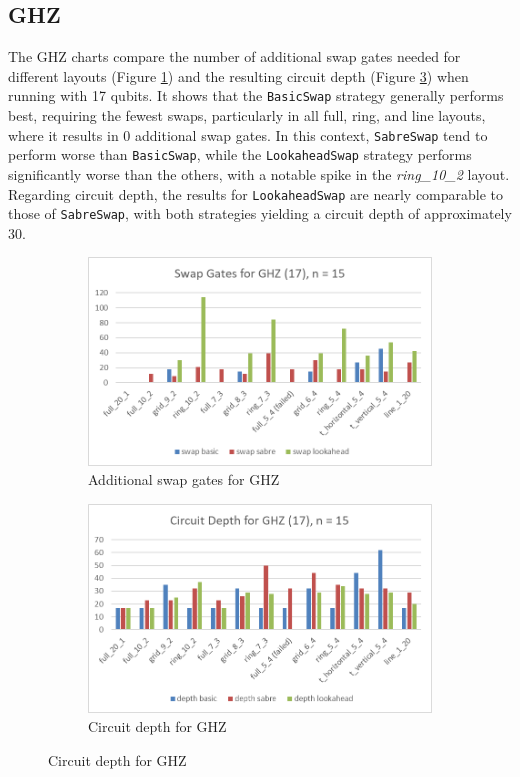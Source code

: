 \subsection{GHZ} %
The GHZ charts compare the number of additional swap gates needed for different layouts (Figure \ref{fig:chart-ghz}) and the resulting circuit depth (Figure \ref{fig:chart-ghz-depth}) when running with 17 qubits. It shows that the \lstinline{BasicSwap} strategy generally performs best, requiring the fewest swaps, particularly in all full, ring, and line layouts, where it results in 0 additional swap gates. In this context, \lstinline{SabreSwap} tend to perform worse than \lstinline{BasicSwap}, while the \lstinline{LookaheadSwap} strategy performs significantly worse than the others, with a notable spike in the \textit{ring\_10\_2} layout. Regarding circuit depth, the results for \lstinline{LookaheadSwap} are nearly comparable to those of \lstinline{SabreSwap}, with both strategies yielding a circuit depth of approximately 30.
\begin{figure}[htb]
    \centering
    \begin{subfigure}{0.48\linewidth}
        \includegraphics[width=\linewidth]{image/chart_ghz.png}
        \caption{Additional swap gates for GHZ}
        \label{fig:chart-ghz}
    \end{subfigure}
    \begin{subfigure}{0.48\linewidth}
        \includegraphics[width=\linewidth]{image/chart_ghz_depth.png}
        \caption{Circuit depth for GHZ}
        \label{fig:chart-ghz-depth}
    \end{subfigure}
\end{figure}

